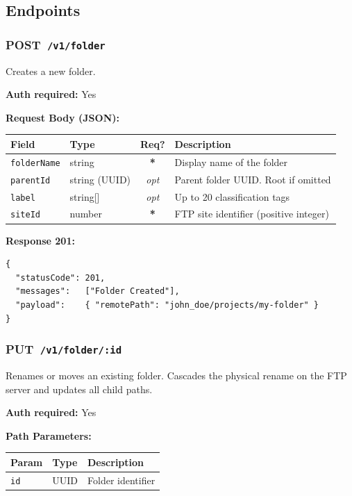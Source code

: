 \documentclass[12pt,a4paper]{article}
\newcommand{\httppost}[1]{%
  \colorbox{postcolor!20}{\textcolor{postcolor}{\textbf{\small POST}}}~\texttt{#1}%
}
\newcommand{\httpput}[1]{%
  \colorbox{putcolor!20}{\textcolor{putcolor}{\textbf{\small PUT}}}~\texttt{#1}%
}
\newcommand{\required}{\textcolor{danger}{\textbf{*}}}
\newcommand{\optional}{\textcolor{muted}{\textit{opt}}}
\begin{document}
\subsection{Endpoints}

\subsubsection{\httppost{/v1/folder}}

Creates a new folder.

\textbf{Auth required:} Yes

\textbf{Request Body (JSON):}

\begin{tabularx}{\linewidth}{llcX}
\toprule
\textbf{Field} & \textbf{Type} & \textbf{Req?} & \textbf{Description} \\
\midrule
\texttt{folderName} & string  & \required & Display name of the folder \\
\texttt{parentId}   & string (UUID) & \optional & Parent folder UUID. Root if omitted \\
\texttt{label}      & string[]& \optional & Up to 20 classification tags \\
\texttt{siteId}     & number  & \required & FTP site identifier (positive integer) \\
\bottomrule
\end{tabularx}

\textbf{Response 201:}
\begin{lstlisting}
{
  "statusCode": 201,
  "messages":   ["Folder Created"],
  "payload":    { "remotePath": "john_doe/projects/my-folder" }
}
\end{lstlisting}

\vspace{0.5em}
\subsubsection{\httpput{/v1/folder/:id}}

Renames or moves an existing folder. Cascades the physical rename on the FTP server and updates all child paths.

\textbf{Auth required:} Yes

\textbf{Path Parameters:}

\begin{tabularx}{\linewidth}{llX}
\toprule
\textbf{Param} & \textbf{Type} & \textbf{Description} \\
\midrule
\texttt{id} & UUID & Folder identifier \\
\bottomrule
\end{tabularx}
\end{document}
